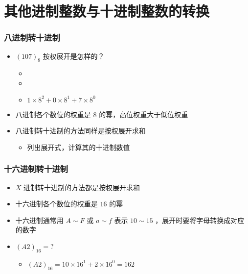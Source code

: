 \section{其他进制整数与十进制整数的转换}

\begin{frame}[fragile]
    \frametitle{八进制转十进制}

    \begin{itemize}
        \item  $(107)_{8}$ 按权展开是怎样的？
        \begin{itemize}
           \item {}
           \item {}
           \item $1 \times 8^2 + 0 \times 8^1 + 7 \times 8^0$
        \end{itemize}
        \item<3-> 八进制各个数位的权重是 $8$ 的幂，高位权重大于低位权重
        \item<4-> 八进制转十进制的方法同样是按权展开求和
        \begin{itemize}
           \item 列出展开式，计算其的十进制数值
        \end{itemize}
    \end{itemize}

\end{frame}

\begin{frame}[fragile]
    \frametitle{十六进制转十进制}

    \begin{itemize}[<+->]
        \item  $X$ 进制转十进制的方法都是按权展开求和
        \item 十六进制各个数位的权重是 $16$ 的幂
        \item 十六进制通常用 $A \sim F$ 或 $a \sim f$ 表示 $10 \sim 15$ ，展开时要将字母转换成对应的数字
        \item $(A2)_{16} = ?$
        \begin{itemize}
           \item $(A2)_{16} = 10 \times 16^1 + 2 \times 16^0 = 162$
        \end{itemize}
    \end{itemize}

\end{frame}

